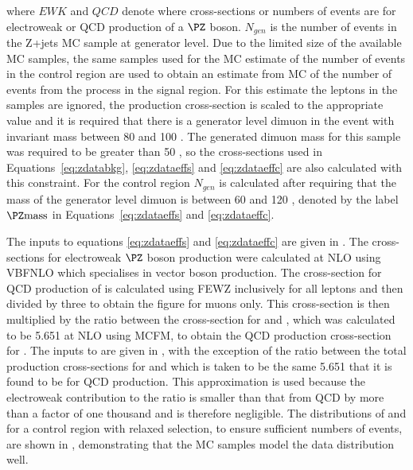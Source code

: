 where $EWK$ and $QCD$ denote where cross-sections or numbers of events are for electroweak or \ac{QCD} production of a $\PZ$ boson. $N_{gen}$ is the number of events in the Z+jets \ac{MC} sample at generator level. Due to the limited size of the available \Znunu \ac{MC} samples, the same \Zmumu samples used for the \ac{MC} estimate of the number of events in the control region are used to obtain an estimate from \ac{MC} of the number of events from the \Znunu process in the signal region. For this estimate the leptons in the \Zmumu samples are ignored, the production cross-section is scaled to the appropriate \Znunu value and it is required that there is a generator level dimuon in the event with invariant mass between 80 and 100 \GeV. The generated dimuon mass for this sample was required to be greater than 50 \GeV, so the cross-sections used in Equations~\ref{eq:zdatabkg}, \ref{eq:zdataeffs} and \ref{eq:zdataeffc} are also calculated with this constraint. For the control region $N_{gen}$ is calculated after requiring that the mass of the generator level dimuon is between 60 and 120 \GeV, denoted by the label $\PZ \rm{mass}$ in Equations~\ref{eq:zdataeffs} and \ref{eq:zdataeffc}.


The inputs to equations \ref{eq:zdataeffs} and \ref{eq:zdataeffc} are given in . The cross-sections for electroweak $\PZ$ boson production were calculated at NLO using \textsc{VBFNLO} which specialises in vector boson production. The cross-section for \ac{QCD} production of \Zmumu is calculated using \textsc{FEWZ} inclusively for all leptons and then divided by three to obtain the figure for muons only. This cross-section is then multiplied by the ratio between the cross-section for \Znunu and \Zmumu, which was calculated to be 5.651 at NLO using \textsc{MCFM}, to obtain the \ac{QCD} production cross-section for \Znunu. The inputs to  are given in , with the exception of the ratio between the total production cross-sections for \Znunu and \Zmumu which is taken to be the same 5.651 that it is found to be for \ac{QCD} production. This approximation is used because the electroweak contribution to the ratio is smaller than that from \ac{QCD} by more than a factor of one thousand and is therefore negligible. The distributions of \METnoMU and \Mjj for a \PZ control region with relaxed selection, to ensure sufficient numbers of events, are shown in , demonstrating that the \ac{MC} samples model the data distribution well.

